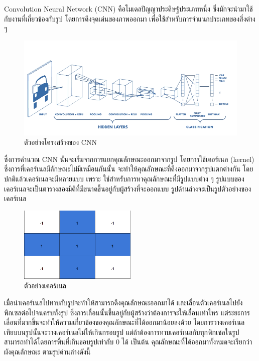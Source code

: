Convolution Neural Network (CNN) คือโมเดลปัญญาประดิษฐ์ประเภทหนึ่ง ซึ่งมักจะนำมาใช้กับงานที่เกี่ยวข้องกับรูป โดยการดึงจุดเด่นของภาพออกมา เพื่อใช้สำหรับการจำแนกประเภทของสิ่งต่าง ๆ

\begin{figure}[!ht]
	\centering
	\includegraphics[width=1\textwidth]{chapter2/images/CNN.png}
		\caption{ตัวอย่างโครงสร้างของ CNN}
    	\label{fig:CNN architecture}
\end{figure}

ซึ่งการคำนวณ CNN นั้นจะเริ่มจากการแยกคุณลักษณะออกมาจากรูป โดยการใช้เคอร์เนล (kernel) ซึ่งการที่เคอร์เนลมีลักษณะไม่มีเหมือนกันนั้น จะทำให้คุณลักษณะที่ดึงออกมาจากรูปแตกต่างกัน โดยปกติแล้วเคอร์เนลจะมีหลายแบบ เพราะ ใช่สำหรับการหาคุณลักษณะที่มีรูปแบบต่าง ๆ รูปแบบของเคอร์เนลจะเป็นตารางสองมิติที่มีขนาดขึ้นอยู่กับผู้สร้างที่จะออกแบบ รูปด้านล่างจะเป็นรูปตัวอย่างของเคอร์เนล

 \begin{figure}[!ht]
	\centering
	\includegraphics[width=0.5\textwidth]{chapter2/images/kernel_3x3.png}
		\caption{ตัวอย่างเคอร์เนล }
    	\label{fig:CNN architecture}
\end{figure}
\clearpage
เมื่อนำเคอร์เนลไปทาบกับรูปจะทำให้สามารถดึงคุณลักษณะออกมาได้ และเลื่อนตัวเคอร์เนลไปยังพิกเซลต่อไปจนครบทั้งรูป ซึ่งการเลื่อนนั้นขึ้นอยู่กับผู้สร้างว่าต้องการจะให้เลื่อนเท่าไหร แต่ระยะการเลื่อนที่มากขึ้นจะทำให้ความเกี่ยวข้องของคุณลักษณะที่ได้ออกมาน้อยลงด้วย โดยการวางเคอร์เนลเทียบบนรูปนั้นจะวางเคอร์เนลไม่ไห้เกินกรอบรูป แต่ถ้าต้องการทาบเคอร์เนลกับทุกพิกเซลในรูป สามารถทำได้โดยการพื้นที่เกินขอบรูปเท่ากับ 0 ได้ เป็นต้น คุณลักษณะที่ได้ออกมาทั้งหมดจะเรียกว่าผังคุณลักษณะ ตามรูปด่านล่างดังนี้


